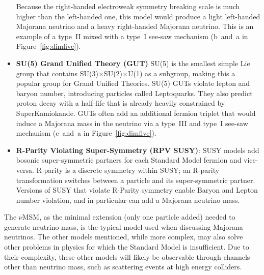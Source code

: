 \documentclass[/main.tex]{subfiles}
\begin{document}
\begin{itemize}
  Because the right-handed electroweak symmetry breaking scale is much higher than the left-handed one, this model would produce a light left-handed Majorana neutrino and a heavy right-handed Majorana neutrino.
  This is an example of a type~II mixed with a type~I see-saw mechanism (b~and~a in Figure~\ref{fig:dimfive}).
\item \textbf{SU(5) Grand Unified Theory (GUT)} SU(5) is the smallest simple Lie group that contains SU(3)$\times$SU(2)$\times$U(1) as a subgroup, making this a popular group for Grand Unified Theories.
  SU(5) GUTs violate lepton and baryon number, introducing particles called Leptoquarks.
  They also predict proton decay with a half-life that is already heavily constrained by SuperKamiokande\cite{SuperK:pdecay}.
  GUTs often add an additional fermion triplet that would induce a Majorana mass in the neutrino via a type~III and type~I see-saw mechanism (c~and~a in Figure~\ref{fig:dimfive}).
\item \textbf{R-Parity Violating Super-Symmetry (RPV SUSY)}: SUSY models add bosonic super-symmetric partners for each Standard Model fermion and vice-versa.
  R-parity is a discrete symmetry within SUSY; an R-parity transformation switches between a particle and its super-symmetric partner.
  Versions of SUSY that violate R-Parity symmetry enable Baryon and Lepton number violation, and in particular can add a Majorana neutrino mass.
\end{itemize}
The $\nu$MSM, as the minimal extension (only one particle added) needed to generate neutrino mass, is the typical model used when discussing Majorana neutrinos.
The other models mentioned, while more complex, may also solve other problems in physics for which the Standard Model is insufficient.
Due to their complexity, these other models will likely be observable through channels other than neutrino mass, such as scattering events at high energy colliders.
\end{document}
